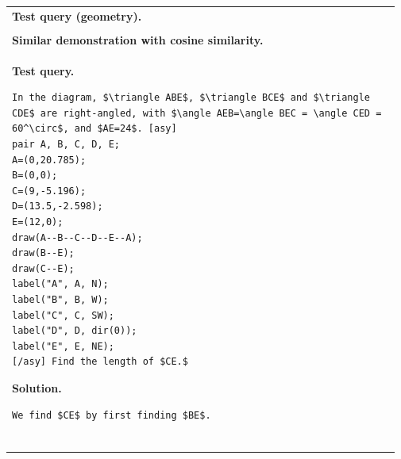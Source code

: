 \documentclass{llmxive}
\begin{document}
\begin{table}[!htbp]
\centering
\tiny
\begin{tabular}{p{0.97\linewidth}}
\toprule
\textbf{Test query (geometry).} 
\vspace{-2mm}
\begin{lstlisting}
In the diagram, $\triangle XYZ$ is right-angled at $X,$ with $YX=60$ and $XZ=80.$ The point $W$ is on $YZ$ so that $WX$ is perpendicular to $YZ.$ Determine the length of $WZ.$ [asy]
pair X, Y, Z, W;
Y=(0,0);
X=(36,48);
Z=(100,0);
W=(36,0);
draw(X--Y--Z--X--W);
label("Y", Y, SW);
label("X", X, N);
label("W", W, S);
label("Z", Z, SE);
label("60", (X+Y)/2, NW);
label("80", (X+Z)/2, NE);
{[/asy]}\\
\end{lstlisting}
\textbf{Solution.}
\vspace{-2mm}
\begin{lstlisting}
By the Pythagorean Theorem, \begin{align*}
YZ^2 &= YX^2 + XZ^2 
&= 60^2+80^2 
&= 3600+6400 
&=10000,
\end{align*} so $YZ=100.$

(We could also have found $YZ$ without using the Pythagorean Theorem by noticing that $\triangle XYZ$ is a right-angled triangle with its right-angle at $X$ and $XY=60=3\cdot 20$ and $XZ=80=4\cdot 20.$ This means that $\triangle XYZ$ is similar to a 3-4-5 triangle, and so $YZ=5\cdot 20=100.$)

Since $\triangle YXZ$ is right-angled at $X,$ its area is $$\frac{1}{2}\cdot 60\cdot 80=2400.$$ Since $XW$ is perpendicular to $YZ,$ then the area of $\triangle YXZ$ is also equal to $$\frac{1}{2}\cdot 100\cdot XW=50XW.$$ Therefore, $50XW=2400,$ so $XW=48.$ By the Pythagorean Theorem, \begin{align*}
WZ^2 &= 80^2 - 48^2
&= 6400 - 2304
&= 4096.
\end{align*} Thus, $WZ = \sqrt{4096}=\boxed{64}.$

An alternative solution comes by noticing that $\triangle XZW$ and $\triangle YZX$ are similar. Therefore \[\frac{WZ}{XZ}=\frac{XZ}{YZ}\] or \[\frac{WZ}{80}=\frac{80}{100}=\frac45.\] This tells us that  \[WZ=\frac45\cdot80=\boxed{64}.\]
\end{lstlisting}

\\ \midrule
\textbf{Similar demonstration with cosine similarity.} \\
\textbf{Test query.} 
\vspace{-2mm}
\begin{lstlisting}
In the diagram, $\triangle ABE$, $\triangle BCE$ and $\triangle CDE$ are right-angled, with $\angle AEB=\angle BEC = \angle CED = 60^\circ$, and $AE=24$. [asy] 
pair A, B, C, D, E;
A=(0,20.785);
B=(0,0);
C=(9,-5.196);
D=(13.5,-2.598);
E=(12,0);
draw(A--B--C--D--E--A);
draw(B--E);
draw(C--E);
label("A", A, N);
label("B", B, W);
label("C", C, SW);
label("D", D, dir(0));
label("E", E, NE);
[/asy] Find the length of $CE.$
\end{lstlisting}
\textbf{Solution.}
\vspace{-2mm}
\begin{lstlisting}
We find $CE$ by first finding $BE$.


\end{lstlisting}
\end{tabular}
\end{table}
\end{document}

